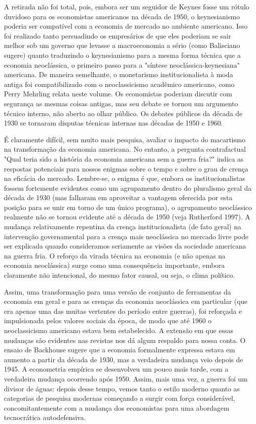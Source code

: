 \documentclass[a4paper,12pt]{article}[abntex2]
\begin{document}
A retirada não foi total, pois, embora ser um seguidor de Keynes fosse um rótulo duvidoso para os economistas americanos na década de 1950, o keynesianismo poderia ser compatível com a economia de mercado no ambiente americano. Isso foi realizado tanto persuadindo os empresários de que eles poderiam se sair melhor sob um governo que levasse a macroeconomia a sério (como Balisciano sugere) quanto traduzindo o keynesianismo para a mesma forma técnica que a economia neoclássica, o primeiro passo para a "síntese neoclássica-keynesiana" americana. De maneira semelhante, o monetarismo institucionalista à moda antiga foi compatibilizado com o neoclassicismo acadêmico americano, como Perry Mehrling relata neste volume. Os economistas poderiam discutir com segurança as mesmas coisas antigas, mas seu debate se tornou um argumento técnico interno, não aberto ao olhar público. Os debates públicos da década de 1930 se tornaram disputas técnicas internas nas décadas de 1950 e 1960.

É claramente difícil, sem muito mais pesquisa, avaliar o impacto do macartismo na transformação da economia americana. No entanto, a pergunta contrafactual "Qual teria sido a história da economia americana sem a guerra fria?" indica as respostas potenciais para nossos enigmas sobre o tempo e sobre o grau de crença na eficácia do mercado. Lembre-se, o enigma é que, embora os institucionalistas fossem fortemente evidentes como um agrupamento dentro do pluralismo geral da década de 1930 (mas falharam em aproveitar a vantagem oferecida por esta posição para se unir em torno de um único programa), o agrupamento neoclássico realmente não se tornou evidente até a década de 1950 (veja Rutherford 1997). A mudança relativamente repentina da crença institucionalista (de fato geral) na intervenção governamental para a crença mais neoclássica no mercado livre pode ser explicada quando consideramos seriamente as visões da sociedade americana na guerra fria. O reforço da virada técnica na economia (e não apenas na economia neoclássica) surge como uma consequência importante, embora claramente não intencional, do mesmo fator causal, ou seja, o clima político.

Assim, uma transformação para uma versão de conjunto de ferramentas da economia em geral e para as crenças da economia neoclássica em particular (que era apenas uma das muitas vertentes do período entre guerras), foi reforçada e impulsionada pelos valores sociais da época, de modo que até 1960 o neoclassicismo americano estava bem estabelecido. A extensão em que essas mudanças são evidentes nas revistas nos dá algum respaldo para nossa conta. O ensaio de Backhouse sugere que a economia formalmente expressa estava em aumento a partir da década de 1930, mas a verdadeira mudança veio depois de 1945. A econometria empírica se desenvolveu um pouco mais tarde, com a verdadeira mudança ocorrendo após 1950. Assim, mais uma vez, a guerra foi um divisor de águas: depois desse tempo, vemos tanto o estilo moderno quanto as categorias de pesquisa modernas começando a surgir com força considerável, concomitantemente com a mudança dos economistas para uma abordagem tecnocrática autodefensiva.
\end{document}
